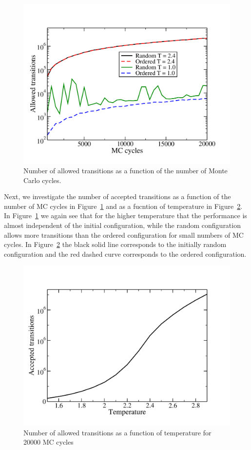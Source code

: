 \documentclass[prc,amsmath,twocolumn,superscriptaddress]{revtex4}
\begin{document}
\begin{figure}[t]
\includegraphics[scale=0.33]{config_mc.pdf}
\caption{Number of allowed transitions as a function of the number of Monte Carlo cycles.}
\label{config_mc}
\end{figure}

Next, we investigate the number of accepted transitions as a function of the number of MC cycles in Figure~\ref{config_mc} and as a fucntion of temperature in Figure~\ref{config_T}. In Figure~\ref{config_mc} we again see that for the higher temperature that the performance is almost independent of the initial configuration, while the random configuration allows more transitions than the ordered configuration for small numbers of MC cycles. In Figure~\ref{config_T} the black solid line corresponds to the initially random configuration and the red dashed curve corresponds to the ordered configuration.

\begin{figure}[b]
\includegraphics[scale=0.33]{config_T.pdf}
\caption{Number of allowed transitions as a function of temperature for 20000 MC cycles}
\label{config_T}
\end{figure}
\end{document}
